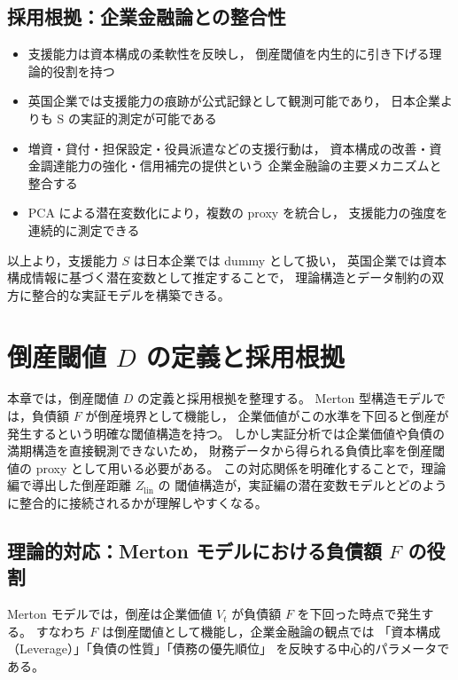 \subsection{採用根拠：企業金融論との整合性}

\begin{itemize}
    \item 支援能力は資本構成の柔軟性を反映し，
          倒産閾値を内生的に引き下げる理論的役割を持つ
    \item 英国企業では支援能力の痕跡が公式記録として観測可能であり，
          日本企業よりも S の実証的測定が可能である
    \item 増資・貸付・担保設定・役員派遣などの支援行動は，
          資本構成の改善・資金調達能力の強化・信用補完の提供という
          企業金融論の主要メカニズムと整合する
    \item PCA による潜在変数化により，複数の proxy を統合し，
          支援能力の強度を連続的に測定できる
\end{itemize}

以上より，支援能力 $S$ は日本企業では dummy として扱い，
英国企業では資本構成情報に基づく潜在変数として推定することで，
理論構造とデータ制約の双方に整合的な実証モデルを構築できる。

\section{倒産閾値 $D$ の定義と採用根拠}
\label{sec:d_theoretical}

本章では，倒産閾値 $D$ の定義と採用根拠を整理する。
Merton 型構造モデルでは，負債額 $F$ が倒産境界として機能し，
企業価値がこの水準を下回ると倒産が発生するという明確な閾値構造を持つ。
しかし実証分析では企業価値や負債の満期構造を直接観測できないため，
財務データから得られる負債比率を倒産閾値の proxy として用いる必要がある。
この対応関係を明確化することで，理論編で導出した倒産距離 $Z_{\text{lin}}$ の
閾値構造が，実証編の潜在変数モデルとどのように整合的に接続されるかが理解しやすくなる。

\subsection{理論的対応：Merton モデルにおける負債額 $F$ の役割}

Merton モデルでは，倒産は企業価値 $V_t$ が負債額 $F$ を下回った時点で発生する。
すなわち $F$ は倒産閾値として機能し，企業金融論の観点では
「資本構成（Leverage）」「負債の性質」「債務の優先順位」
を反映する中心的パラメータである。

